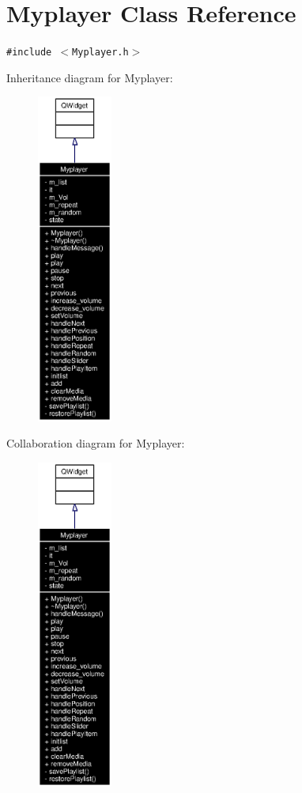 \section{Myplayer Class Reference}
\label{classMyplayer}
{\tt \#include $<$Myplayer.h$>$}

Inheritance diagram for Myplayer:\begin{figure}[H]
\begin{center}
\leavevmode
\includegraphics[width=70pt]{classMyplayer__inherit__graph}
\end{center}
\end{figure}
Collaboration diagram for Myplayer:\begin{figure}[H]
\begin{center}
\leavevmode
\includegraphics[width=70pt]{classMyplayer__coll__graph}
\end{center}
\end{figure}
